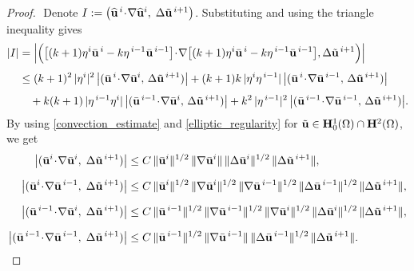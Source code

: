 \documentclass{article}
\theoremstyle{definition}                   %
\begin{document}
\begin{proof}
$ $\newline
Denote $
I:=\bigl(\widehat {\bf u}^{\,i}\!\cdot\!\nabla \widehat {\bf u}^{i},\;\Delta\tilde {\bf u}^{\,i+1}\bigr)$.
Substituting and using the triangle inequality 
gives
\begin{align*}
|I|
&= \Bigl|\Bigl(\big[(k+1)\eta^{i}\bar {\bf u}^{\,i}-k\eta^{\,i-1}\bar {\bf u}^{\,i-1}\big]\!\cdot\!\nabla \big[(k+1)\eta^{i}\bar {\bf u}^{\,i}-k\eta^{\,i-1}\bar {\bf u}^{\,i-1}\big],
\Delta\tilde {\bf u}^{\,i+1}\Bigr)\Bigr|\\[4pt]
&\le (k+1)^2\,|\eta^{i}|^2\,
    \bigl|(\bar {\bf u}^{\,i}\!\cdot\!\nabla \bar {\bf u}^{i},\,\Delta\tilde {\bf u}^{\,i+1})\bigr|
  +(k+1)k\,|\eta^{i}\eta^{\,i-1}|\,
    \bigl|(\bar {\bf u}^{\,i}\!\cdot\!\nabla \bar {\bf u}^{\,i-1},\,\Delta\tilde {\bf u}^{\,i+1})\bigr|\\[4pt]
&\quad +k(k+1)\,|\eta^{\,i-1}\eta^{i}|\,
    \bigl|(\bar {\bf u}^{\,i-1}\!\cdot\!\nabla \bar {\bf u}^{i},\,\Delta\tilde {\bf u}^{\,i+1})\bigr|
  +k^2\,|\eta^{\,i-1}|^2\,
    \bigl|(\bar {\bf u}^{\,i-1}\!\cdot\!\nabla \bar{\bf u}^{\,i-1},\,\Delta\tilde {\bf u}^{\,i+1})\bigr|.
\end{align*}
%
By using \eqref{convection_estimate} and \eqref{elliptic_regularity} for $\tilde{\bf u} \in {\bf H}^1_0(\Omega)\cap {\bf H}^2(\Omega)$, we get
\[
\begin{aligned}
\bigl|(\bar {\bf u}^{i}\!\cdot\!\nabla \bar {\bf u}^{i},\;\Delta\tilde {\bf u}^{\,i+1})\bigr|
&\le C\,\|\bar {\bf u}^{i}\|^{1/2}\,\|\nabla\bar {\bf u}^{i}\|\,\|\Delta\bar {\bf u}^{i}\|^{1/2}\,\|\Delta\tilde {\bf u}^{\,i+1}\|,\\[6pt]
\bigl|(\bar {\bf u}^{i}\!\cdot\!\nabla \bar {\bf u}^{\,i-1},\;\Delta\tilde {\bf u}^{\,i+1})\bigr|
&\le C\,\|\bar {\bf u}^{i}\|^{1/2}\,\|\nabla\bar {\bf u}^{i}\|^{1/2}\,
     \|\nabla\bar {\bf u}^{\,i-1}\|^{1/2}\,\|\Delta\bar {\bf u}^{\,i-1}\|^{1/2}\,\|\Delta\tilde {\bf u}^{\,i+1}\|,\\[6pt]
\bigl|(\bar {\bf u}^{\,i-1}\!\cdot\!\nabla \bar {\bf u}^{i},\;\Delta\tilde {\bf u}^{\,i+1})\bigr|
&\le C\,\|\bar {\bf u}^{\,i-1}\|^{1/2}\,\|\nabla\bar {\bf u}^{\,i-1}\|^{1/2}\,
     \|\nabla\bar {\bf u}^{i}\|^{1/2}\,\|\Delta\bar {\bf u}^{i}\|^{1/2}\,\|\Delta\tilde {\bf u}^{\,i+1}\|,\\[6pt]
\bigl|(\bar {\bf u}^{\,i-1}\!\cdot\!\nabla \bar {\bf u}^{\,i-1},\;\Delta\tilde {\bf u}^{\,i+1})\bigr|
&\le C\,\|\bar {\bf u}^{\,i-1}\|^{1/2}\,\|\nabla\bar {\bf u}^{\,i-1}\|\,\|\Delta\bar {\bf u}^{\,i-1}\|^{1/2}\,\|\Delta\tilde {\bf u}^{\,i+1}\|.
\end{aligned}
\]


\end{proof}
\end{document}
